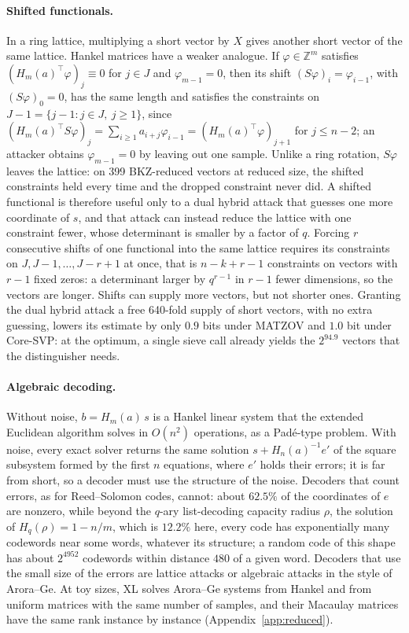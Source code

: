 \documentclass[11pt,a4paper]{article}
\theoremstyle{definition}
\newcommand{\Z}{\mathbb{Z}}
\begin{document}
\paragraph{Shifted functionals.} In a ring lattice, multiplying a short vector by $X$ gives another short vector of the same lattice. Hankel matrices have a weaker analogue. If $\varphi \in \Z^m$ satisfies $(H_m(a)^{\top}\varphi)_j \equiv 0$ for $j \in J$ and $\varphi_{m-1} = 0$, then its shift $(S\varphi)_i = \varphi_{i-1}$, with $(S\varphi)_0 = 0$, has the same length and satisfies the constraints on $J - 1 = \{j - 1 : j \in J,\ j \ge 1\}$, since $(H_m(a)^{\top} S\varphi)_j = \sum_{i \ge 1} a_{i+j}\varphi_{i-1} = (H_m(a)^{\top}\varphi)_{j+1}$ for $j \le n - 2$; an attacker obtains $\varphi_{m-1} = 0$ by leaving out one sample. Unlike a ring rotation, $S\varphi$ leaves the lattice: on 399 BKZ-reduced vectors at reduced size, the shifted constraints held every time and the dropped constraint never did. A shifted functional is therefore useful only to a dual hybrid attack that guesses one more coordinate of $s$, and that attack can instead reduce the lattice with one constraint fewer, whose determinant is smaller by a factor of $q$. Forcing $r$ consecutive shifts of one functional into the same lattice requires its constraints on $J, J - 1, \dots, J - r + 1$ at once, that is $n - k + r - 1$ constraints on vectors with $r - 1$ fixed zeros: a determinant larger by $q^{r-1}$ in $r - 1$ fewer dimensions, so the vectors are longer. Shifts can supply more vectors, but not shorter ones. Granting the dual hybrid attack a free 640-fold supply of short vectors, with no extra guessing, lowers its estimate by only $0.9$ bits under MATZOV and $1.0$ bit under Core-SVP: at the optimum, a single sieve call already yields the $2^{94.9}$ vectors that the distinguisher needs.

\paragraph{Algebraic decoding.} Without noise, $b = H_m(a)\,s$ is a Hankel linear system that the extended Euclidean algorithm solves in $O(n^2)$ operations, as a Pad\'e-type problem. With noise, every exact solver returns the same solution $s + H_n(a)^{-1}e'$ of the square subsystem formed by the first $n$ equations, where $e'$ holds their errors; it is far from short, so a decoder must use the structure of the noise. Decoders that count errors, as for Reed--Solomon codes, cannot: about $62.5\%$ of the coordinates of $e$ are nonzero, while beyond the $q$-ary list-decoding capacity radius $\rho$, the solution of $H_q(\rho) = 1 - n/m$, which is $12.2\%$ here, every code has exponentially many codewords near some words, whatever its structure; a random code of this shape has about $2^{4952}$ codewords within distance $480$ of a given word. Decoders that use the small size of the errors are lattice attacks or algebraic attacks in the style of Arora--Ge. At toy sizes, XL solves Arora--Ge systems from Hankel and from uniform matrices with the same number of samples, and their Macaulay matrices have the same rank instance by instance (Appendix~\ref{app:reduced}).
\end{document}
